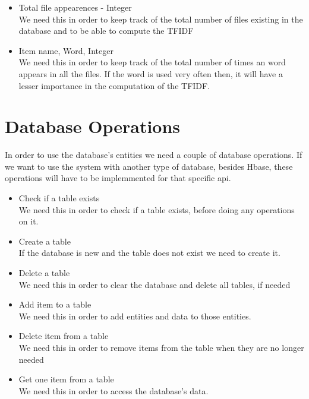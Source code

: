 \begin{itemize}
	\item Total file appearences - Integer
	\\ We need this in order to keep track of the total number of files existing in the database and to be able to compute the TFIDF
	\item Item name, Word, Integer
	\\ We need this in order to keep track of the total number of times an word appears in all the files.
	If the word is used very often then, it will have a lesser importance in the computation of the TFIDF.
\end{itemize}

\section{Database Operations}
\label{sec:database-operations}
In order to use the database's entities we need a couple of database operations.
If we want to use the system with another type of database, besides Hbase, these operations will have to be implemmented for that specific api.

\begin{itemize}
	\item Check if a table exists
	\\ We need this in order to check if a table exists, before doing any operations on it.
	\item Create a table
	\\ If the database is new and the table does not exist we need to create it.
	\item Delete a table
	\\ We need this in order to clear the database and delete all tables, if needed
	\item Add item to a table
	\\ We need this in order to add entities and data to those entities.
	\item Delete item from a table
	\\ We need this in order to remove items from the table when they are no longer needed
	\item Get one item from a table
	\\ We need this in order to access the database's data.
\end{itemize}

